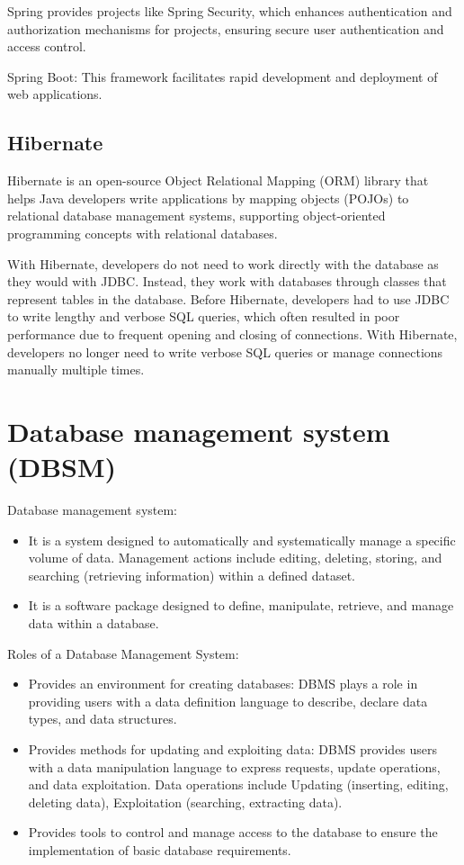 \documentclass[../Main.tex]{subfiles}
\begin{document}
Spring provides projects like Spring Security, which enhances authentication and authorization mechanisms for projects, ensuring secure user authentication and access control.

Spring Boot: This framework facilitates rapid development and deployment of web applications.

\subsection{Hibernate}

Hibernate is an open-source Object Relational Mapping (ORM) library that helps Java developers write applications by mapping objects (POJOs) to relational database management systems, supporting object-oriented programming concepts with relational databases.

With Hibernate, developers do not need to work directly with the database as they would with JDBC.
Instead, they work with databases through classes that represent tables in the database.
Before Hibernate, developers had to use JDBC to write lengthy and verbose SQL queries, which often resulted in poor performance due to frequent opening and closing of connections.
With Hibernate, developers no longer need to write verbose SQL queries or manage connections manually multiple times.

\section{Database management system (DBSM)}

Database management system:

\begin{itemize}
    \item It is a system designed to automatically and systematically manage a specific volume of data.
          Management actions include editing, deleting, storing, and searching (retrieving information) within a defined dataset.
    \item It is a software package designed to define, manipulate, retrieve, and manage data within a database.
\end{itemize}

Roles of a Database Management System:

\begin{itemize}
    \item Provides an environment for creating databases: DBMS plays a role in providing users with a data definition language to describe, declare data types, and data structures.
    \item Provides methods for updating and exploiting data: DBMS provides users with a data manipulation language to express requests, update operations, and data exploitation.
          Data operations include Updating (inserting, editing, deleting data), Exploitation (searching, extracting data).
    \item Provides tools to control and manage access to the database to ensure the implementation of basic database requirements.
\end{itemize}
\end{document}
